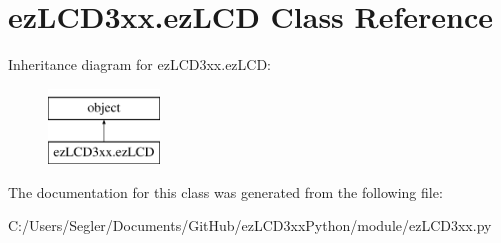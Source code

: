 \hypertarget{classez_l_c_d3xx_1_1ez_l_c_d}{\section{ez\-L\-C\-D3xx.\-ez\-L\-C\-D Class Reference}
\label{d0/dc0/classez_l_c_d3xx_1_1ez_l_c_d}
}
Inheritance diagram for ez\-L\-C\-D3xx.\-ez\-L\-C\-D\-:\begin{figure}[H]
\begin{center}
\leavevmode
\includegraphics[height=2.000000cm]{d0/dc0/classez_l_c_d3xx_1_1ez_l_c_d}
\end{center}
\end{figure}


The documentation for this class was generated from the following file\-:\begin{DoxyCompactItemize}
\item 
C\-:/\-Users/\-Segler/\-Documents/\-Git\-Hub/ez\-L\-C\-D3xx\-Python/module/ez\-L\-C\-D3xx.\-py\end{DoxyCompactItemize}
